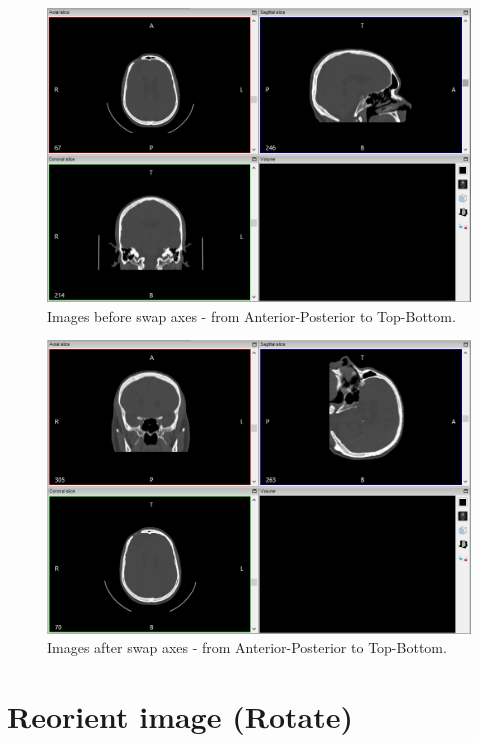 \begin{figure}[!htb]
\centering
\includegraphics[scale=0.4]{../user_guide_figures/invesalius_screen/invert_axis_axial_en.png}
\caption{Images before swap axes - from Anterior-Posterior to Top-Bottom.}
\label{fig:invert_axis_axial}
\end{figure}

\begin{figure}[!htb]
\centering
\includegraphics[scale=0.4]{../user_guide_figures/invesalius_screen/invert_axis_axial_inverted_en.png}
\caption{Images after swap axes - from Anterior-Posterior to Top-Bottom.}
\label{fig:invert_axis_axial_inverted}
\end{figure}

\section{Reorient image (Rotate)}

